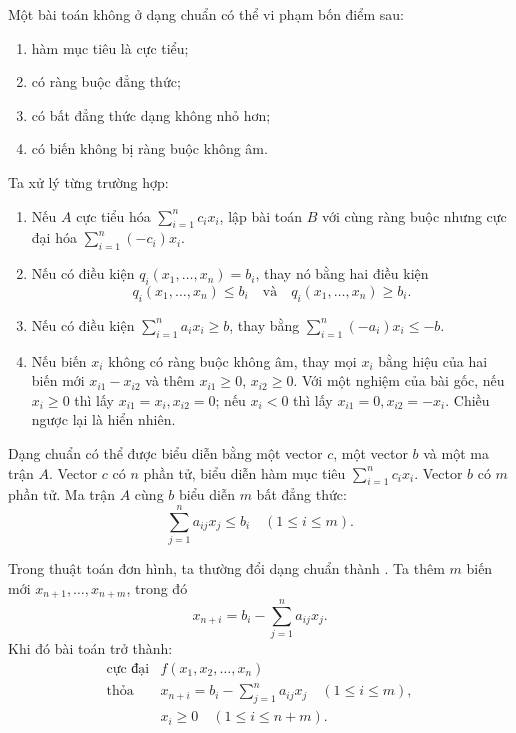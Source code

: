 \documentclass[11pt]{article}
\begin{document}
Một bài toán không ở dạng chuẩn có thể vi phạm bốn điểm sau:
\begin{enumerate}
  \item hàm mục tiêu là cực tiểu;
  \item có ràng buộc đẳng thức;
  \item có bất đẳng thức dạng không nhỏ hơn;
  \item có biến không bị ràng buộc không âm.
\end{enumerate}

Ta xử lý từng trường hợp:
\begin{enumerate}
  \item Nếu $A$ cực tiểu hóa $\sum_{i=1}^{n} c_ix_i$, lập bài toán $B$ với
  cùng ràng buộc nhưng cực đại hóa $\sum_{i=1}^{n}(-c_i)x_i$.

  \item Nếu có điều kiện $q_i(x_1,\ldots,x_n)=b_i$, thay nó bằng hai điều
  kiện
  \[
    q_i(x_1,\ldots,x_n)\le b_i
    \quad\text{và}\quad
    q_i(x_1,\ldots,x_n)\ge b_i.
  \]

  \item Nếu có điều kiện $\sum_{i=1}^{n} a_ix_i\ge b$, thay bằng
  $\sum_{i=1}^{n}(-a_i)x_i\le -b$.

  \item Nếu biến $x_i$ không có ràng buộc không âm, thay mọi $x_i$ bằng hiệu
  của hai biến mới $x_{i1}-x_{i2}$ và thêm $x_{i1}\ge 0$, $x_{i2}\ge 0$.
  Với một nghiệm của bài gốc, nếu $x_i\ge 0$ thì lấy $x_{i1}=x_i,x_{i2}=0$;
  nếu $x_i<0$ thì lấy $x_{i1}=0,x_{i2}=-x_i$. Chiều ngược lại là hiển nhiên.
\end{enumerate}

Dạng chuẩn có thể được biểu diễn bằng một vector $c$, một vector $b$ và một
ma trận $A$. Vector $c$ có $n$ phần tử, biểu diễn hàm mục tiêu
$\sum_{i=1}^{n} c_ix_i$. Vector $b$ có $m$ phần tử. Ma trận $A$ cùng $b$ biểu
diễn $m$ bất đẳng thức:
\[
  \sum_{j=1}^{n} a_{ij}x_j\le b_i\quad (1\le i\le m).
\]

Trong thuật toán đơn hình, ta thường đổi dạng chuẩn thành .
Ta thêm $m$ biến mới $x_{n+1},\ldots,x_{n+m}$, trong đó
\[
  x_{n+i}=b_i-\sum_{j=1}^{n} a_{ij}x_j.
\]
Khi đó bài toán trở thành:
\[
\begin{array}{ll}
\text{cực đại} & f(x_1,x_2,\ldots,x_n)\\
\text{thỏa} & \displaystyle
x_{n+i}=b_i-\sum_{j=1}^{n} a_{ij}x_j\quad (1\le i\le m),\\
& x_i\ge 0\quad (1\le i\le n+m).
\end{array}
\]
\end{document}
